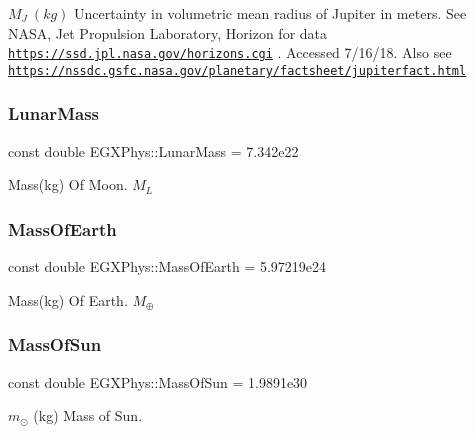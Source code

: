 $M_{J} \ (kg)$ Uncertainty in volumetric mean radius of Jupiter in meters. See N\+A\+SA, Jet Propulsion Laboratory, Horizon for data \href{https://ssd.jpl.nasa.gov/horizons.cgi}{\tt https\+://ssd.\+jpl.\+nasa.\+gov/horizons.\+cgi} . Accessed 7/16/18. Also see \href{https://nssdc.gsfc.nasa.gov/planetary/factsheet/jupiterfact.html}{\tt https\+://nssdc.\+gsfc.\+nasa.\+gov/planetary/factsheet/jupiterfact.\+html} \mbox{\label{namespace_e_g_x_phys_a55e13f18ccd52a098969eaa5755c448e}} 
\subsubsection{\texorpdfstring{Lunar\+Mass}{LunarMass}}
{\footnotesize\ttfamily const double E\+G\+X\+Phys\+::\+Lunar\+Mass = 7.\+342e22}

Mass(kg) Of Moon. $M_L$ \mbox{\label{namespace_e_g_x_phys_ace4a9d8c0b21215536857f4c1087a4e8}} 
\subsubsection{\texorpdfstring{Mass\+Of\+Earth}{MassOfEarth}}
{\footnotesize\ttfamily const double E\+G\+X\+Phys\+::\+Mass\+Of\+Earth = 5.\+97219e24}

Mass(kg) Of Earth. $M_\oplus$ \mbox{\label{namespace_e_g_x_phys_a6e84ae13f1dbcecb215af787bbc12cd6}} 
\subsubsection{\texorpdfstring{Mass\+Of\+Sun}{MassOfSun}}
{\footnotesize\ttfamily const double E\+G\+X\+Phys\+::\+Mass\+Of\+Sun = 1.\+9891e30}

$m_\odot$ (kg) Mass of Sun. \mbox{\label{namespace_e_g_x_phys_a05709972a6a6089eb968f667ce0bf656}} 
